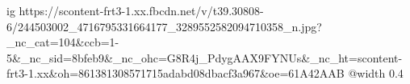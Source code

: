  
 
 
 
 

\ifcmt
  ig https://scontent-frt3-1.xx.fbcdn.net/v/t39.30808-6/244503002_4716795331664177_3289552582094710358_n.jpg?_nc_cat=104&ccb=1-5&_nc_sid=8bfeb9&_nc_ohc=G8R4j_PdygAAX9FYNUs&_nc_ht=scontent-frt3-1.xx&oh=861381308571715adabd08dbacf3a967&oe=61A42AAB
  @width 0.4
\fi


